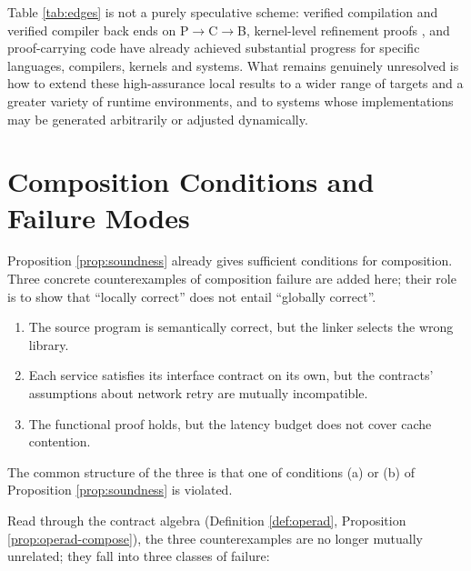 \begin{remark}
Table \ref{tab:edges} is not a purely speculative scheme: verified compilation
\cite{leroy2009} and verified compiler back ends \cite{cakeml2019} on P$\to$C$\to$B,
kernel-level refinement proofs \cite{klein2009}, and proof-carrying code \cite{necula1997}
have already achieved substantial progress for specific languages, compilers, kernels and
systems. What remains genuinely unresolved is how to extend these high-assurance local
results to a wider range of targets and a greater variety of runtime environments, and to
systems whose implementations may be generated arbitrarily or adjusted dynamically.
\end{remark}

\section{Composition Conditions and Failure Modes}\label{sec:composition}

Proposition \ref{prop:soundness} already gives sufficient conditions for composition. Three
concrete counterexamples of composition failure are added here; their role is to show that
``locally correct'' does not entail ``globally correct''.

\begin{example}\label{ex:compose-fail}
\begin{enumerate}[label=(\alph*)]
\item The source program is semantically correct, but the linker selects the wrong library.
\item Each service satisfies its interface contract on its own, but the contracts'
      assumptions about network retry are mutually incompatible.
\item The functional proof holds, but the latency budget does not cover cache contention.
\end{enumerate}
The common structure of the three is that one of conditions (a) or (b) of
Proposition \ref{prop:soundness} is violated.
\end{example}

Read through the contract algebra (Definition \ref{def:operad},
Proposition \ref{prop:operad-compose}), the three counterexamples are no longer mutually
unrelated; they fall into three classes of failure:

